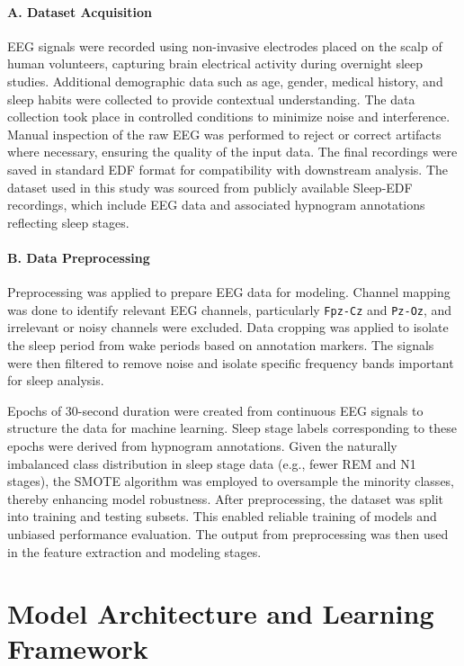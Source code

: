 \paragraph{A. Dataset Acquisition}

EEG signals were recorded using non-invasive electrodes placed on the scalp of human volunteers, capturing brain electrical activity during overnight sleep studies. Additional demographic data such as age, gender, medical history, and sleep habits were collected to provide contextual understanding. The data collection took place in controlled conditions to minimize noise and interference. Manual inspection of the raw EEG was performed to reject or correct artifacts where necessary, ensuring the quality of the input data. The final recordings were saved in standard EDF format for compatibility with downstream analysis. The dataset used in this study was sourced from publicly available Sleep-EDF recordings, which include EEG data and associated hypnogram annotations reflecting sleep stages.

\paragraph{B. Data Preprocessing}

Preprocessing was applied to prepare EEG data for modeling. Channel mapping was done to identify relevant EEG channels, particularly \texttt{Fpz-Cz} and \texttt{Pz-Oz}, and irrelevant or noisy channels were excluded. Data cropping was applied to isolate the sleep period from wake periods based on annotation markers. The signals were then filtered to remove noise and isolate specific frequency bands important for sleep analysis.

Epochs of 30-second duration were created from continuous EEG signals to structure the data for machine learning. Sleep stage labels corresponding to these epochs were derived from hypnogram annotations. Given the naturally imbalanced class distribution in sleep stage data (e.g., fewer REM and N1 stages), the SMOTE algorithm was employed to oversample the minority classes, thereby enhancing model robustness. After preprocessing, the dataset was split into training and testing subsets. This enabled reliable training of models and unbiased performance evaluation. The output from preprocessing was then used in the feature extraction and modeling stages.




\section{Model Architecture and Learning Framework}



